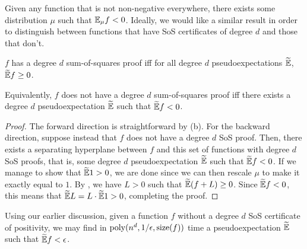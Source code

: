	Given any function that is not non-negative everywhere, there exists some distribution $\mu$ such that $\mathbb{E}_\mu f < 0$. Ideally, we would like a similar result in order to distinguish between functions that have SoS certificates of degree $d$ and those that don't.

	\begin{ftheo}
		\label{theo: sos-pe-equiv}
		$f$ has a degree $d$ sum-of-squares proof iff for all degree $d$ pseudoexpectations $\widetilde{\mathbb{E}}$, $\widetilde{\mathbb{E}} f \ge 0$.
	\end{ftheo}
	Equivalently, $f$ does not have a degree $d$ sum-of-squares proof iff there exists a degree $d$ pseudoexpectation $\widetilde{\mathbb{E}}$ such that $\widetilde{\mathbb{E}} f < 0$.
	\begin{proof}
		The forward direction is straightforward by (b). For the backward direction, suppose instead that $f$ does not have a degree $d$ SoS proof. Then, there exists a separating hyperplane between $f$ and this set of functions with degree $d$ SoS proofs, that is, some degree $d$ pseudoexpectation $\widetilde{\mathbb{E}}$ such that $\widetilde{\mathbb{E}} f < 0$. If we manage to show that $\widetilde{\mathbb{E}} 1 > 0$, we are done since we can then rescale $\mu$ to make it exactly equal to $1$. By , we have $L > 0$ such that $\widetilde{\mathbb{E}} (f+L) \ge 0$. Since $\widetilde{\mathbb{E}} f < 0$, this means that $\widetilde{\mathbb{E}} L = L \cdot \widetilde{\mathbb{E}} 1 > 0$, completing the proof.
	\end{proof}

	Using our earlier discussion, given a function $f$ without a degree $d$ SoS certificate of positivity, we may find in $\operatorname{poly}(n^d,1/\epsilon,\operatorname{size}(f))$ time a pseudoexpectation $\widetilde{\mathbb{E}}$ such that $\widetilde{\mathbb{E}} f < \epsilon$.

